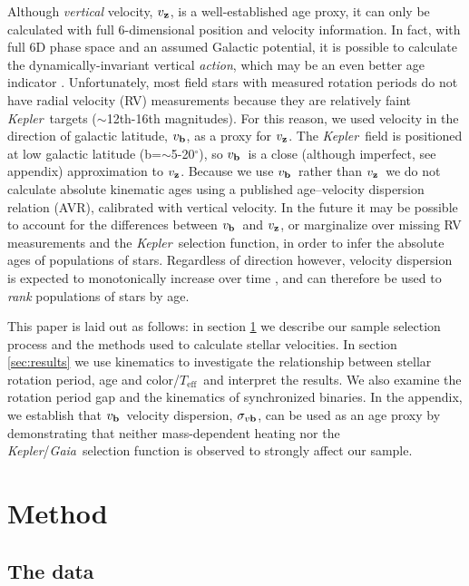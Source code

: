 \documentclass{aastex63}
\newcommand{\eg}{{\it e.g.}}
\newcommand{\kepler}{{\it Kepler}}
\newcommand{\gaia}{{\it Gaia}}
\newcommand{\teff}{$T_{\mathrm{eff}}$}
\newcommand{\degrees}{$^\circ$}
\newcommand{\vz}{$v_{\bf z}$}
\newcommand{\vb}{$v_{\bf b}$}
\newcommand{\sigmavb}{$\sigma_{v{\bf b}}$}
\newcommand{\racomment}[1]{{\color{blue}#1}}
\begin{document}
Although {\it vertical} velocity, \vz, is \racomment{a well-established} age
proxy, it can only be calculated with full 6-dimensional position and velocity
information.
In fact, with full 6D phase space and an assumed Galactic potential, it is
possible to calculate the dynamically-invariant vertical {\it action}, which may
be an even better age indicator \citep{beane2018, ting2019}.
Unfortunately, most field stars with measured rotation periods do not have
radial velocity (RV) measurements because they are relatively faint \kepler\
targets ($\sim$12th-16th magnitudes).
For this reason, we used velocity in the direction of galactic latitude, \vb,
as a proxy for \vz.
The \kepler\ field is positioned at low galactic latitude
(b=$\sim$5-20\degrees), so \vb\ is a close (although imperfect, see
appendix) approximation to \vz.
Because we use \vb\ rather than \vz\, we do not calculate absolute kinematic
ages using a published age--velocity dispersion relation (AVR), calibrated with
vertical velocity.
In the future it may be possible to account for the differences between \vb\
and \vz, or marginalize over missing RV measurements and the \kepler\
selection function, in order to infer the absolute ages of populations of
stars.
Regardless of direction however, velocity dispersion is expected to
monotonically increase over time \citep[\eg][]{holmberg2009}, and can
therefore be used to {\it rank} populations of stars by age.

This paper is laid out as follows: in section \ref{sec:method} we describe our
sample selection process and the methods used to calculate stellar
velocities.
In section \ref{sec:results} we use kinematics to investigate the relationship
between stellar rotation period, age and color/\teff\ and interpret the
results.
We also examine the rotation period gap and the kinematics of synchronized
binaries.
In the appendix, we establish that \vb\ velocity dispersion, \sigmavb, can be
used as an age proxy by demonstrating that neither mass-dependent heating nor
the \kepler/\gaia\ selection function is observed to strongly affect our
sample.

\section{Method}
\label{sec:method}

\subsection{The data}
\label{sec:the_data}
\end{document}
